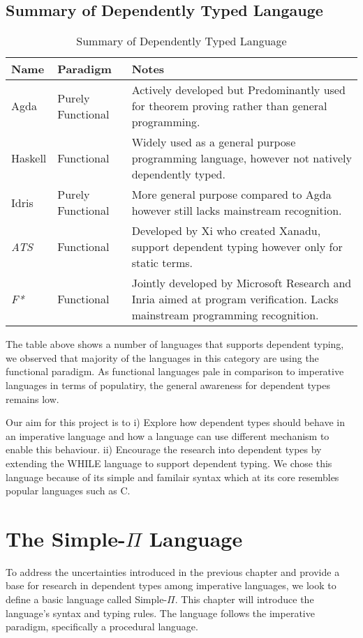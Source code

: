 \documentclass[a4paper,12pt]{report}
\begin{document}
\section{Summary of Dependently Typed Langauge}
\begin{table} [H]
  \begin{tabular}{|p{2cm}|p{2cm}|p{10cm}|}
    \hline
    \textbf{Name} & \textbf{Paradigm} & \textbf{Notes} \\ 
    \hline
    Agda & Purely Functional & Actively developed but 
      Predominantly used for theorem proving rather than general programming. \\ 
    \hline
    Haskell & Functional & Widely used as a general purpose programming language, however not natively dependently typed. \\ 
    \hline
    Idris & Purely Functional & More general purpose compared to Agda however 
      still lacks mainstream recognition. \\
    \hline
    \textit{ATS} \cite{ATS} & Functional & Developed by Xi who created Xanadu, 
      support dependent typing however only for static terms. \\
    \hline
    \textit{F*} \cite{FStar} & Functional & Jointly developed by Microsoft 
    Research and Inria aimed at program verification. Lacks mainstream 
    programming recognition.\\
    \hline
  \end{tabular}
  \caption{Summary of Dependently Typed Language}
\end{table}

\par
The table above shows a number of languages that supports dependent typing, we 
observed that majority of the languages in this category are using the 
functional paradigm. As functional languages pale in comparison to imperative 
languages in terms of populatiry, the general awareness for dependent types 
remains low. 

\par
Our aim for this project is to i) Explore how dependent types should behave in 
an imperative language and how a language can use different mechanism to enable 
this behaviour. ii) Encourage the research into dependent types by extending the 
WHILE language \cite{whileLanguage} to support dependent typing. We chose this 
language because of its simple and familair syntax which at its core resembles 
popular languages such as C. 

\chapter{The Simple-$\Pi$ Language}
To address the uncertainties introduced in the previous chapter and provide a 
base for research in dependent types among imperative languages, we look to 
define a basic language called Simple-$\Pi$. This chapter will introduce 
the language's syntax and typing rules. The language follows 
the imperative paradigm, specifically a procedural language.
\end{document}
